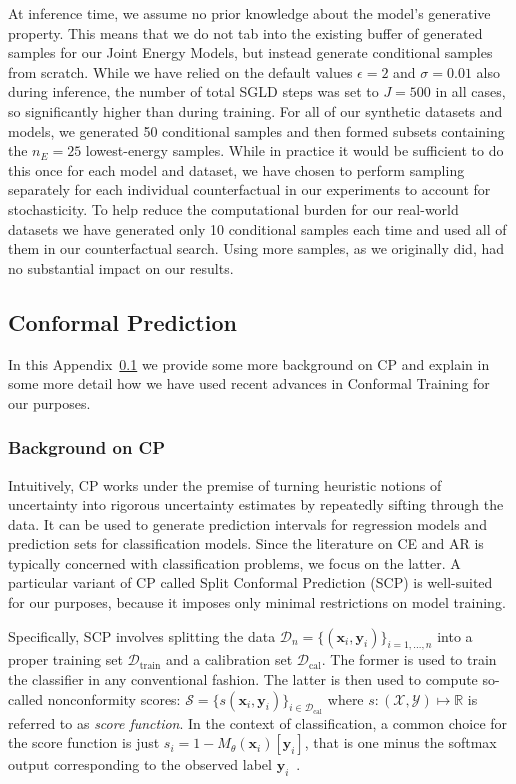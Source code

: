 At inference time, we assume no prior knowledge about the model's generative property. This means that we do not tab into the existing buffer of generated samples for our Joint Energy Models, but instead generate conditional samples from scratch. While we have relied on the default values $\epsilon=2$ and $\sigma=0.01$ also during inference, the number of total SGLD steps was set to $J=500$ in all cases, so significantly higher than during training. For all of our synthetic datasets and models, we generated 50 conditional samples and then formed subsets containing the $n_{E}=25$ lowest-energy samples. While in practice it would be sufficient to do this once for each model and dataset, we have chosen to perform sampling separately for each individual counterfactual in our experiments to account for stochasticity. To help reduce the computational burden for our real-world datasets we have generated only 10 conditional samples each time and used all of them in our counterfactual search. Using more samples, as we originally did, had no substantial impact on our results.

\subsection{Conformal Prediction}\label{app:cp}

In this Appendix~\ref{app:cp} we provide some more background on CP and explain in some more detail how we have used recent advances in Conformal Training for our purposes.

\subsubsection{Background on CP}

Intuitively, CP works under the premise of turning heuristic notions of uncertainty into rigorous uncertainty estimates by repeatedly sifting through the data. It can be used to generate prediction intervals for regression models and prediction sets for classification models. Since the literature on CE and AR is typically concerned with classification problems, we focus on the latter. A particular variant of CP called Split Conformal Prediction (SCP) is well-suited for our purposes, because it imposes only minimal restrictions on model training. 

Specifically, SCP involves splitting the data $\mathcal{D}_n=\{(\mathbf{x}_i,\mathbf{y}_i)\}_{i=1,...,n}$ into a proper training set $\mathcal{D}_{\text{train}}$ and a calibration set $\mathcal{D}_{\text{cal}}$. The former is used to train the classifier in any conventional fashion. The latter is then used to compute so-called nonconformity scores: $\mathcal{S}=\{s(\mathbf{x}_i,\mathbf{y}_i)\}_{i \in \mathcal{D}_{\text{cal}}}$ where $s: (\mathcal{X},\mathcal{Y}) \mapsto \mathbb{R}$ is referred to as \textit{score function}. In the context of classification, a common choice for the score function is just $s_i=1-M_{\theta}(\mathbf{x}_i)[\mathbf{y}_i]$, that is one minus the softmax output corresponding to the observed label $\mathbf{y}_i$~\citep{angelopoulos2021gentle}. 

